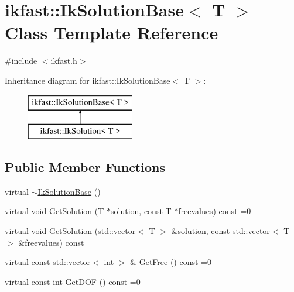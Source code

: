 \hypertarget{classikfast_1_1IkSolutionBase}{\section{ikfast\-:\-:Ik\-Solution\-Base$<$ T $>$ Class Template Reference}
\label{classikfast_1_1IkSolutionBase}
}


{\ttfamily \#include $<$ikfast.\-h$>$}

Inheritance diagram for ikfast\-:\-:Ik\-Solution\-Base$<$ T $>$\-:\begin{figure}[H]
\begin{center}
\leavevmode
\includegraphics[height=2.000000cm]{classikfast_1_1IkSolutionBase}
\end{center}
\end{figure}
\subsection*{Public Member Functions}
\begin{DoxyCompactItemize}
\item 
virtual \hyperlink{classikfast_1_1IkSolutionBase_ae40e464cdbc474388cc7d55560ec44f9}{$\sim$\-Ik\-Solution\-Base} ()
\item 
virtual void \hyperlink{classikfast_1_1IkSolutionBase_a9405530feb49f12f56c3175e7150c66f}{Get\-Solution} (T $\ast$solution, const T $\ast$freevalues) const =0
\item 
virtual void \hyperlink{classikfast_1_1IkSolutionBase_a2b558f7a29be0868cff3e81fbd9594c4}{Get\-Solution} (std\-::vector$<$ T $>$ \&solution, const std\-::vector$<$ T $>$ \&freevalues) const 
\item 
virtual const std\-::vector$<$ int $>$ \& \hyperlink{classikfast_1_1IkSolutionBase_a2693ede66be937b7c4c1c949284282ca}{Get\-Free} () const =0
\item 
virtual const int \hyperlink{classikfast_1_1IkSolutionBase_aac54f54aa69b27991651b0ba2a21208c}{Get\-D\-O\-F} () const =0
\end{DoxyCompactItemize}



